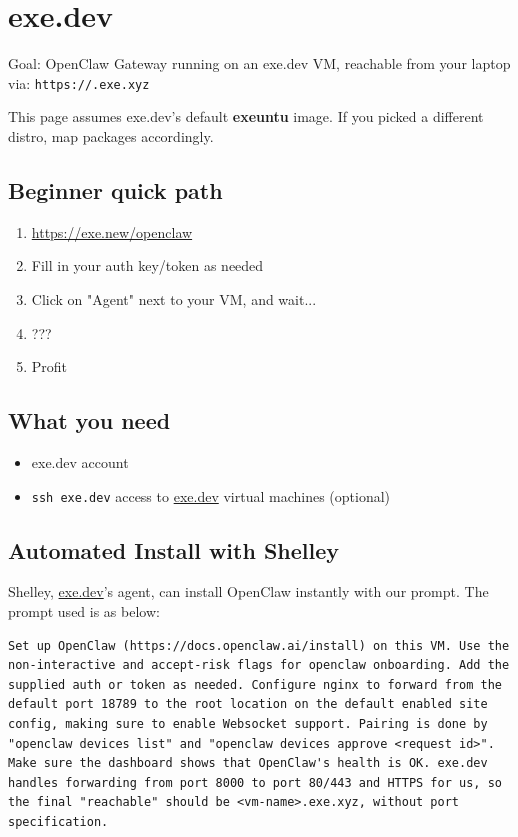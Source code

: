 \clearpage

\section{exe.dev}


Goal: OpenClaw Gateway running on an exe.dev VM, reachable from your laptop via: \texttt{https://.exe.xyz}

This page assumes exe.dev's default \textbf{exeuntu} image. If you picked a different distro, map packages accordingly.

\subsection{Beginner quick path}


\begin{enumerate}
  \item \href{https://exe.new/openclaw}{https://exe.new/openclaw}
  \item Fill in your auth key/token as needed
  \item Click on "Agent" next to your VM, and wait...
  \item ???
  \item Profit
\end{enumerate}


\subsection{What you need}


\begin{itemize}
  \item exe.dev account
  \item \texttt{ssh exe.dev} access to \href{https://exe.dev}{exe.dev} virtual machines (optional)
\end{itemize}


\subsection{Automated Install with Shelley}


Shelley, \href{https://exe.dev}{exe.dev}'s agent, can install OpenClaw instantly with our
prompt. The prompt used is as below:

\begin{lstlisting}
Set up OpenClaw (https://docs.openclaw.ai/install) on this VM. Use the non-interactive and accept-risk flags for openclaw onboarding. Add the supplied auth or token as needed. Configure nginx to forward from the default port 18789 to the root location on the default enabled site config, making sure to enable Websocket support. Pairing is done by "openclaw devices list" and "openclaw devices approve <request id>". Make sure the dashboard shows that OpenClaw's health is OK. exe.dev handles forwarding from port 8000 to port 80/443 and HTTPS for us, so the final "reachable" should be <vm-name>.exe.xyz, without port specification.
\end{lstlisting}



